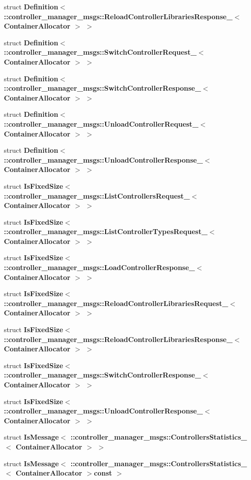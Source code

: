 \begin{DoxyCompactItemize}
struct {\bf \-Definition$<$ \-::controller\-\_\-manager\-\_\-msgs\-::\-Reload\-Controller\-Libraries\-Response\-\_\-$<$ Container\-Allocator $>$ $>$}
\item 
struct {\bf \-Definition$<$ \-::controller\-\_\-manager\-\_\-msgs\-::\-Switch\-Controller\-Request\-\_\-$<$ Container\-Allocator $>$ $>$}
\item 
struct {\bf \-Definition$<$ \-::controller\-\_\-manager\-\_\-msgs\-::\-Switch\-Controller\-Response\-\_\-$<$ Container\-Allocator $>$ $>$}
\item 
struct {\bf \-Definition$<$ \-::controller\-\_\-manager\-\_\-msgs\-::\-Unload\-Controller\-Request\-\_\-$<$ Container\-Allocator $>$ $>$}
\item 
struct {\bf \-Definition$<$ \-::controller\-\_\-manager\-\_\-msgs\-::\-Unload\-Controller\-Response\-\_\-$<$ Container\-Allocator $>$ $>$}
\item 
struct {\bf \-Is\-Fixed\-Size$<$ \-::controller\-\_\-manager\-\_\-msgs\-::\-List\-Controllers\-Request\-\_\-$<$ Container\-Allocator $>$ $>$}
\item 
struct {\bf \-Is\-Fixed\-Size$<$ \-::controller\-\_\-manager\-\_\-msgs\-::\-List\-Controller\-Types\-Request\-\_\-$<$ Container\-Allocator $>$ $>$}
\item 
struct {\bf \-Is\-Fixed\-Size$<$ \-::controller\-\_\-manager\-\_\-msgs\-::\-Load\-Controller\-Response\-\_\-$<$ Container\-Allocator $>$ $>$}
\item 
struct {\bf \-Is\-Fixed\-Size$<$ \-::controller\-\_\-manager\-\_\-msgs\-::\-Reload\-Controller\-Libraries\-Request\-\_\-$<$ Container\-Allocator $>$ $>$}
\item 
struct {\bf \-Is\-Fixed\-Size$<$ \-::controller\-\_\-manager\-\_\-msgs\-::\-Reload\-Controller\-Libraries\-Response\-\_\-$<$ Container\-Allocator $>$ $>$}
\item 
struct {\bf \-Is\-Fixed\-Size$<$ \-::controller\-\_\-manager\-\_\-msgs\-::\-Switch\-Controller\-Response\-\_\-$<$ Container\-Allocator $>$ $>$}
\item 
struct {\bf \-Is\-Fixed\-Size$<$ \-::controller\-\_\-manager\-\_\-msgs\-::\-Unload\-Controller\-Response\-\_\-$<$ Container\-Allocator $>$ $>$}
\item 
struct {\bf \-Is\-Message$<$ \-::controller\-\_\-manager\-\_\-msgs\-::\-Controllers\-Statistics\-\_\-$<$ Container\-Allocator $>$ $>$}
\item 
struct {\bf \-Is\-Message$<$ \-::controller\-\_\-manager\-\_\-msgs\-::\-Controllers\-Statistics\-\_\-$<$ Container\-Allocator $>$const  $>$}

\end{DoxyCompactItemize}
